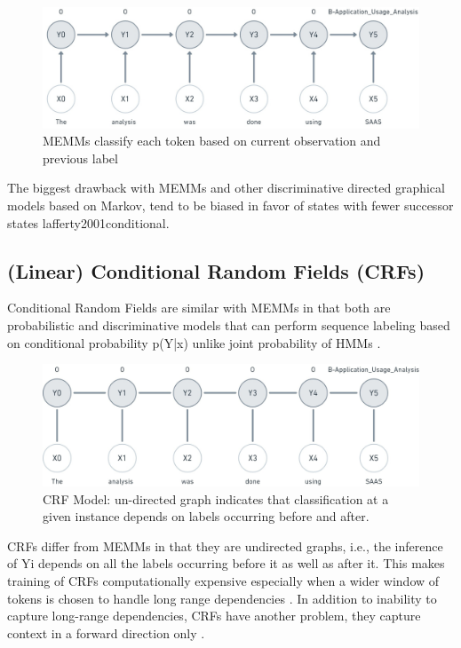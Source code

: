 \begin{figure}[htbp]
	\centering
	\includegraphics[width=1\textwidth]{4.graphics/figures/ch_5/MEMM}
	\caption{MEMMs classify each token based on current observation and previous label}
	\label{fig:chapter03:setup}
\end{figure}

The biggest drawback with MEMMs and other discriminative directed graphical models based on Markov, tend to be biased in favor of states with fewer successor states {lafferty2001conditional}. 

\subsection{(Linear) Conditional Random Fields (\ac{CRF}s)}
\label{sec:chapter05:MLModels:CRFs}

Conditional Random Fields are similar with \ac{MEMM}s in that both are probabilistic and discriminative models that can perform sequence labeling based on conditional probability p(Y|x) unlike joint probability of \ac{HMM}s \citep{wallach2004conditional}. 

\begin{figure}[htbp]
	\centering
	\includegraphics[width=1\textwidth]{4.graphics/figures/ch_5/CRF}
	\caption{\ac{CRF} Model: un-directed graph indicates that classification at a given instance depends on labels occurring before and after.}
	\label{fig:chapter03:setup}
\end{figure}

\ac{CRF}s differ from \ac{MEMM}s in that they are undirected graphs, i.e., the inference of Yi depends on all the labels occurring before it as well as after it. This makes training of CRFs computationally expensive especially when a wider window of tokens is chosen to handle long range dependencies \citep{aggarwal2018machine}. In addition to inability to capture long-range dependencies, CRFs have another problem, they capture context in a forward direction only \citep{lample2016neural}.



